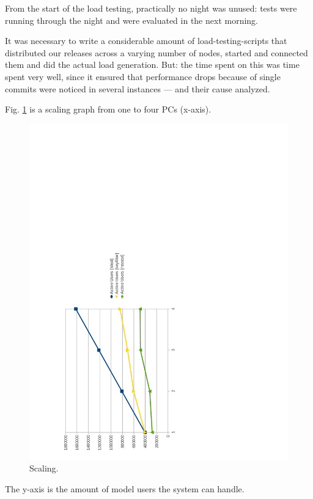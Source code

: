 \documentclass[11pt,a4paper]{report}
\begin{document}
From the start of the load testing, practically no night was unused: tests were
running through the night and were evaluated in the next morning.

It was necessary to write a considerable amount of load-testing-scripts that
distributed our releases across a varying number of nodes, started and connected
them and did the actual load generation. But: the time spent on this was time
spent very well, since it ensured that performance drops because of single
commits were noticed in several instances --- and their cause analyzed.

Fig. \ref{fig:load_test:scaling} is a scaling graph from one to four PCs (x-axis).
\begin{figure}[htbp!]
  \hspace{.5cm}
 \includegraphics[width=14cm, angle=-90]{./graphics/Load_test-scaling.pdf}
 \vspace{-6cm}
 \caption{Scaling.}
 \label{fig:load_test:scaling}
\end{figure}
The y-axis is the amount of model users the system can handle.
\end{document}
